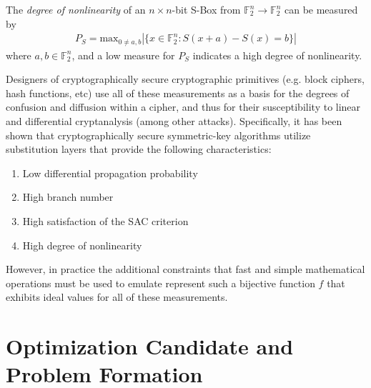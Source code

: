 \documentclass[11pt]{article}
\newcommand{\field}[1]{\mathbb{#1}} %
\begin{document}
\begin{define}
The \emph{degree of nonlinearity} of an $n \times n$-bit S-Box from $\field{F}_2^n \to \field{F}_2^n$ can be measured by
\begin{eqnarray}
	P_S = \text{max}_{0 \not= a, b}|\{x \in \field{F}_2^n : S(x + a) - S(x) = b\}|
\end{eqnarray}
where $a, b \in \field{F}_2^n$, and a low measure for $P_S$ indicates a high degree of nonlinearity.
\end{define}

Designers of cryptographically secure cryptographic primitives (e.g. block ciphers, hash functions, etc) use all of these measurements as a basis for the degrees of confusion and diffusion within a cipher, and thus for their susceptibility to linear and differential cryptanalysis (among other attacks). Specifically, it has been shown that cryptographically secure symmetric-key algorithms utilize substitution layers that provide the following characteristics:
\begin{enumerate}
	\item Low differential propagation probability
	\item High branch number
	\item High satisfaction of the SAC criterion
	\item High degree of nonlinearity
\end{enumerate}
However, in practice the additional constraints that fast and simple mathematical operations must be used to emulate represent such a bijective function $f$ that exhibits ideal values for all of these measurements.

\section{Optimization Candidate and Problem Formation}
\end{document}
